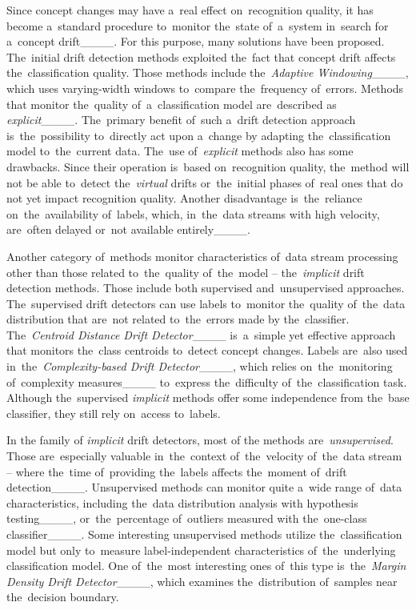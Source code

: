 Since concept changes may have a~real effect on~recognition quality, it has become a~standard procedure to~monitor the~state of~a~system in~search for a~concept drift____. For this purpose, many solutions have been proposed. The~initial drift detection methods exploited the~fact that concept drift affects the~classification quality. Those methods include the~\textit{Adaptive Windowing}____, which uses varying-width windows to~compare the~frequency of~errors. Methods that monitor the~quality of~a~classification model are~described as \textit{explicit}____. The~primary benefit of~such a~drift detection approach is~the~possibility to~directly act upon a~change by adapting the~classification model to~the~current data. The~use of~\textit{explicit} methods also has some drawbacks. Since their operation is~based on~recognition quality, the~method will not be able to~detect the~\textit{virtual} drifts or~the~initial phases of~real ones that do not yet impact recognition quality. Another disadvantage is~the~reliance on~the~availability of~labels, which, in~the~data streams with high velocity, are~often delayed or~not available entirely____.

Another category of~methods monitor characteristics of~data stream processing other than those related to~the~quality of~the~model -- the~\textit{implicit} drift detection methods. Those include both supervised and~unsupervised approaches. The~supervised drift detectors can use labels to~monitor the~quality of~the~data distribution that are~not related to~the~errors made by the~classifier. The~\textit{Centroid Distance Drift Detector}____ is~a~simple yet effective approach that monitors the~class centroids to~detect concept changes. Labels are~also used in~the~\textit{Complexity-based Drift Detector}____, which relies on~the~monitoring of~complexity measures____ to~express the~difficulty of~the~classification task. Although the~supervised \textit{implicit} methods offer some independence from the~base classifier, they still rely on~access to~labels.

In the family of \textit{implicit} drift detectors, most of the methods are~\textit{unsupervised}. Those are~especially valuable in~the~context of~the~velocity of~the~data stream -- where the~time of~providing the~labels affects the~moment of~drift detection____. Unsupervised methods can monitor quite a~wide range of~data characteristics, including the~data distribution analysis with hypothesis testing____, or~the~percentage of~outliers measured with the~one-class classifier____. Some interesting unsupervised methods utilize the~classification model but only to~measure label-independent characteristics of~the~underlying classification model. One of~the~most interesting ones of~this type is~the~\textit{Margin Density Drift Detector}____, which examines the~distribution of~samples near the~decision boundary.  

